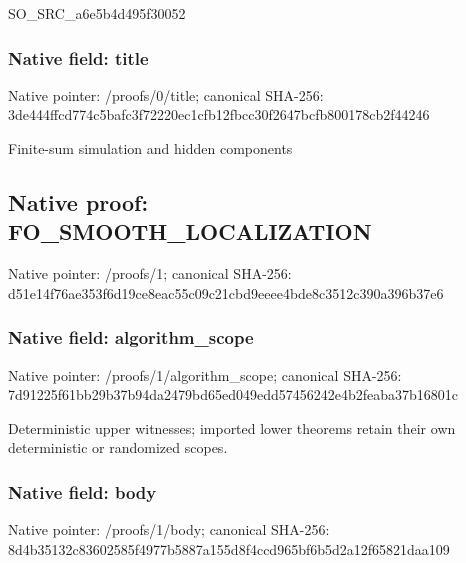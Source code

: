 \documentclass[10pt,a4paper]{article}
\begin{document}
\begingroup\raggedright\sloppy SO\_\allowbreak{}SRC\_\allowbreak{}a6e5b4d495f30052\par\endgroup

\subsubsection{Native field: title}
Native pointer: /proofs/0/title; canonical SHA-256: 3de444ffcd774c5bafc3f72220ec1cfb12fbcc30f2647bcfb800178cb2f44246

\begingroup\raggedright\sloppy Finite-sum simulation and hidden components\par\endgroup

\subsection{Native proof: FO\_\allowbreak{}SMOOTH\_\allowbreak{}LOCALIZATION}
Native pointer: /proofs/1; canonical SHA-256: d51e14f76ae353f6d19ce8eac55c09c21cbd9eeee4bde8c3512c390a396b37e6

\subsubsection{Native field: algorithm\_\allowbreak{}scope}
Native pointer: /proofs/1/algorithm\_\allowbreak{}scope; canonical SHA-256: 7d91225f61bb29b37b94da2479bd65ed049edd57456242e4b2feaba37b16801c

\begingroup\raggedright\sloppy Deterministic upper witnesses;\allowbreak{} imported lower theorems retain their own deterministic or randomized scopes.\par\endgroup

\subsubsection{Native field: body}
Native pointer: /proofs/1/body; canonical SHA-256: 8d4b35132c83602585f4977b5887a155d8f4ccd965bf6b5d2a12f65821daa109
\end{document}
